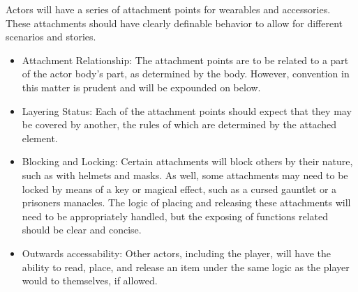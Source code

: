 Actors will have a series of attachment points for wearables and accessories. These attachments should have clearly definable behavior to allow for different scenarios and stories.

\begin{itemize}
    \item Attachment Relationship: The attachment points are to be related to a part of the actor body's part, as determined by the body. However, convention in this matter is prudent and will be expounded on below.
    \item Layering Status: Each of the attachment points should expect that they may be covered by another, the rules of which are determined by the attached element.
    \item Blocking and Locking: Certain attachments will block others by their nature, such as with helmets and masks. As well, some attachments may need to be locked by means of a key or magical effect, such as a cursed gauntlet or a prisoners manacles. The logic of placing and releasing these attachments will need to be appropriately handled, but the exposing of functions related should be clear and concise.
    \item Outwards accessability: Other actors, including the player, will have the ability to read, place, and release an item under the same logic as the player would to themselves, if allowed.
\end{itemize}